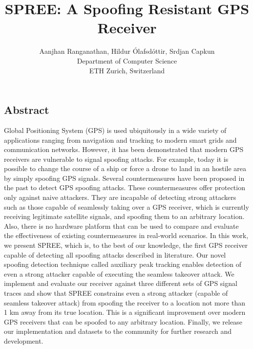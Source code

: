\documentclass[letterpaper,twocolumn,10pt]{article}
\newcommand{\rxname}{SPREE\xspace}
\begin{document}
\date{}
\title{\rxname: A Spoofing Resistant GPS Receiver}

\author{\rm Aanjhan Ranganathan, Hildur \'{O}lafsd\'ottir, Srdjan Capkun\\
Department of Computer Science\\
ETH Zurich, Switzerland\\
} 

\maketitle



\subsection*{Abstract} 
Global Positioning System (GPS) is used ubiquitously in a wide variety of applications ranging from navigation and tracking to modern smart grids and communication networks. However, it has been demonstrated that modern GPS receivers are vulnerable to signal spoofing attacks. For example, today it is possible to change the course of a ship or force a drone to land in an hostile area by simply spoofing GPS signals. Several countermeasures have been proposed in the past to detect GPS spoofing attacks. These countermeasures offer protection only against naive attackers. They are incapable of detecting strong attackers such as those capable of seamlessly taking over a GPS receiver, which is currently receiving legitimate satellite signals, and spoofing them to an arbitrary location. Also, there is no hardware platform that can be used to compare and evaluate the effectiveness of existing countermeasures in real-world scenarios. In this work, we present \rxname, which is, to the best of our knowledge, the first GPS receiver capable of detecting all spoofing attacks described in literature. Our novel spoofing detection technique called auxiliary peak tracking enables detection of even a strong attacker capable of executing the seamless takeover attack. We implement and evaluate our receiver against three different sets of GPS signal traces and show that \rxname constrains even a strong attacker (capable of seamless takeover attack) from spoofing the receiver to a location not more than 1 km away from its true location. This is a significant improvement over modern GPS receivers that can be spoofed to any arbitrary location. Finally, we release our implementation and datasets to the community for further research and development.
\end{document}

